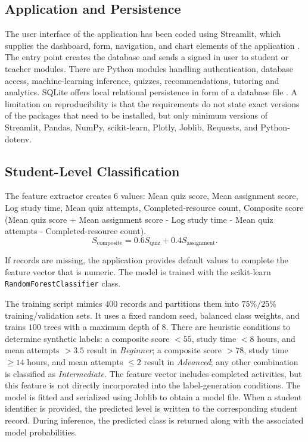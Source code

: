\documentclass[conference]{IEEEtran}
\begin{document}
\subsection{Application and Persistence}
The user interface of the application has been coded using Streamlit, which supplies the dashboard, form, navigation, and chart elements of the application \cite{streamlit}. The entry point creates the database and sends a signed in user to student or teacher modules. There are Python modules handling authentication, database access, machine-learning inference, quizzes, recommendations, tutoring and analytics. SQLite offers local relational persistence in form of a database file \cite{sqlite}. A limitation on reproducibility is that the requirements do not state exact versions of the packages that need to be installed, but only minimum versions of Streamlit, Pandas, NumPy, scikit-learn, Plotly, Joblib, Requests, and Python-dotenv.

\subsection{Student-Level Classification}
The feature extractor creates 6 values: Mean quiz score, Mean assignment score, Log study time, Mean quiz attempts, Completed-resource count, Composite score (Mean quiz score + Mean assignment score - Log study time - Mean quiz attempts - Completed-resource count).
\[
S_{\mathrm{composite}} = 0.6S_{\mathrm{quiz}} + 0.4S_{\mathrm{assignment}}.
\]   
   
If records are missing, the application provides default values to complete the feature vector that is numeric. The model is trained with the scikit-learn \texttt{RandomForestClassifier}\cite{sklearnrf} class.

The training script mimics \(400\) records and partitions them into \(75\%/25\%\) training/validation sets. It uses a fixed random seed, balanced class weights, and trains \(100\) trees with a maximum depth of \(8\). There are heuristic conditions to determine synthetic labels: a composite score \(< 55\), study time \(< 8\) hours, and mean attempts \(> 3.5\) result in \textit{Beginner}; a composite score \(> 78\), study time \(\geq 14\) hours, and mean attempts \(\leq 2\) result in \textit{Advanced}; any other combination is classified as \textit{Intermediate}. The feature vector includes completed activities, but this feature is not directly incorporated into the label-generation conditions. The model is fitted and serialized using Joblib to obtain a model file. When a student identifier is provided, the predicted level is written to the corresponding student record. During inference, the predicted class is returned along with the associated model probabilities.
\end{document}
